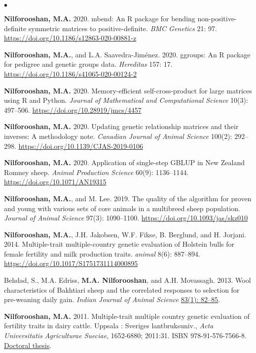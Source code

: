 \documentclass[margin,line]{res}
\newenvironment{list2}{
  \begin{list}{$\bullet$}{%
    \setlength{\itemsep}{0in}
    \setlength{\parsep}{0in} \setlength{\parskip}{0in}
    \setlength{\topsep}{0in} \setlength{\partopsep}{0in}
    \setlength{\leftmargin}{0.2in}}}
  {\end{list}}
\begin{document}
\begin{resume}
\begin{list2}
    \item {\bf Nilforooshan, M.A.} 2020. mbend: An R package for bending non-positive-deﬁnite symmetric matrices to positive-deﬁnite. {\em BMC Genetics} 21: 97. \url{https://doi.org/10.1186/s12863-020-00881-z}
    \item {\bf Nilforooshan, M.A.}, and L.A. Saavedra-Jiménez. 2020. ggroups: An R package for pedigree and genetic groups data. {\em Hereditas} 157: 17. \url{https://doi.org/10.1186/s41065-020-00124-2}
    \item {\bf Nilforooshan, M.A.} 2020. Memory-efficient self-cross-product for large matrices using R and Python. {\em Journal of Mathematical and Computational Science} 10(3): 497--506. \url{https://doi.org/10.28919/jmcs/4457}
    \item {\bf Nilforooshan, M.A.} 2020. Updating genetic relationship matrices and their inverses: A methodology note. {\em Canadian Journal of Animal Science} 100(2): 292--298. \url{https://doi.org/10.1139/CJAS-2019-0106}
    \item {\bf Nilforooshan, M.A.} 2020. Application of single-step GBLUP in New Zealand Romney sheep. {\em Animal Production Science} 60(9): 1136--1144. \url{https://doi.org/10.1071/AN19315}
    \item {\bf Nilforooshan, M.A.}, and M. Lee. 2019. The quality of the algorithm for proven and young with various sets of core animals in a multibreed sheep population. {\em Journal of Animal Science} 97(3): 1090--1100. \url{https://doi.org/10.1093/jas/skz010}
    \item {\bf Nilforooshan, M.A.}, J.H. Jakobsen, W.F. Fikse, B. Berglund, and H. Jorjani. 2014. Multiple-trait multiple-country genetic evaluation of Holstein bulls for female fertility and milk production traits. {\em animal} 8(6): 887--894. \url{https://doi.org/10.1017/S1751731114000895}
    \item Behdad, S., M.A. Edriss, {\bf M.A. Nilforooshan}, and A.H. Movassagh. 2013. Wool characteristics of Bakhtiari sheep and the correlated responses to selection for pre-weaning daily gain. {\em Indian Journal of Animal Science} \href{http://epubs.icar.org.in/ejournal/index.php/IJAnS/article/view/26453}{83(1): 82--85}.
    \item {\bf Nilforooshan, M.A.} 2011. Multiple-trait multiple country genetic evaluation of fertility traits in dairy cattle. Uppsala : Sveriges lantbruksuniv., {\em Acta Universitatis Agriculturae Sueciae}, 1652-6880; 2011:31. ISBN 978-91-576-7566-8. \href{https://res.slu.se/id/publ/33755}{Doctoral thesis}.

\end{list2}
\end{resume}
\end{document}
